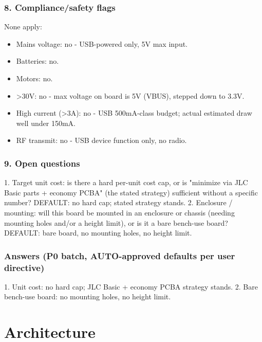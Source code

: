 \documentclass[11pt,a4paper]{article}
\begin{document}
\subsubsection*{8. Compliance/safety flags}
None apply:

\begin{itemize}
\item Mains voltage: no - USB-powered only, 5V max input.
\item Batteries: no.
\item Motors: no.
\item \textgreater{}30V: no - max voltage on board is 5V (VBUS), stepped down to 3.3V.
\item High current (\textgreater{}3A): no - USB 500mA-class budget; actual estimated draw
well under 150mA.
\item RF transmit: no - USB device function only, no radio.
\end{itemize}
\subsubsection*{9. Open questions}
1. Target unit cost: is there a hard per-unit cost cap, or is "minimize via JLC Basic parts + economy PCBA" (the stated strategy) sufficient without a specific number? DEFAULT: no hard cap; stated strategy stands. 2. Enclosure / mounting: will this board be mounted in an enclosure or chassis (needing mounting holes and/or a height limit), or is it a bare bench-use board? DEFAULT: bare board, no mounting holes, no height limit.

\subsubsection*{Answers (P0 batch, AUTO-approved defaults per user directive)}
1. Unit cost: no hard cap; JLC Basic + economy PCBA strategy stands. 2. Bare bench-use board: no mounting holes, no height limit.

\section{Architecture}
\end{document}
